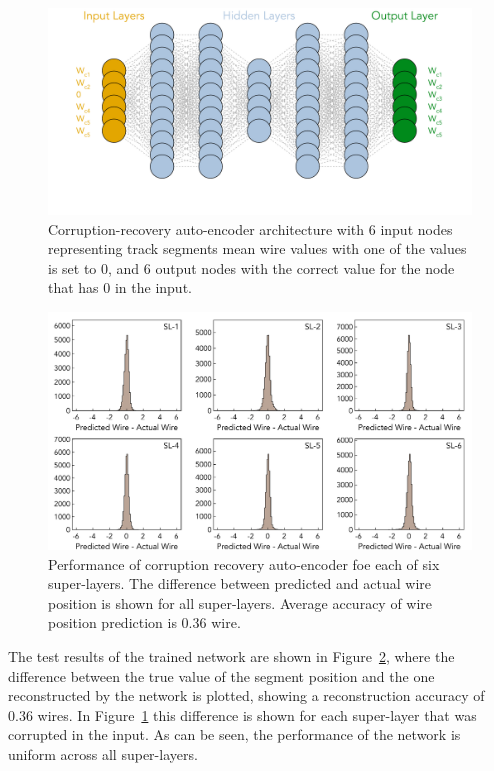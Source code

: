 \documentclass[aps,prl,preprint,12pt]{revtex4}
\begin{document}
 \begin{figure}[!ht]
\begin{center}

\includegraphics[width=4.5in]{images/aue_diagram.pdf}
\caption {Corruption-recovery auto-encoder architecture with 6 input nodes representing track segments 
mean wire values with one of the values is set to 0, and 6 output nodes with the correct value for the node 
that has 0 in the input. }
 \label{autoencoder:architecture}
 \end{center}
\end{figure}

 \begin{figure}[!ht]
\begin{center}
\includegraphics[width=6.0in]{images/encoder_performance.pdf}
\caption {Performance of corruption recovery auto-encoder foe each of six super-layers. The difference between predicted and actual 
wire position is shown for all super-layers. Average accuracy of wire position prediction is  $0.36$ wire.}
 \label{autoencoder:performance}
 \end{center}
\end{figure}

The test results of the trained network are shown in Figure~\ref{autoencoder:performance}, where the 
difference between the true value of the segment position and the one reconstructed by the network is 
plotted, showing a reconstruction accuracy of $0.36$ wires. In Figure~\ref{autoencoder:architecture} 
this difference is shown for each super-layer that was corrupted in the input. As can be seen, 
the performance of the network is uniform across all super-layers.
\end{document}
